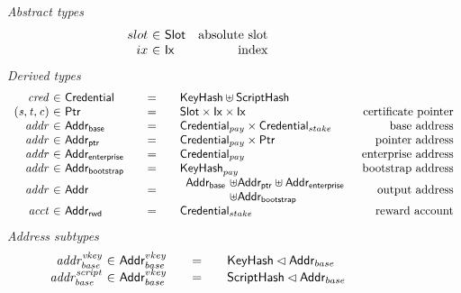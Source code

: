 \begin{figure*}[hbt]
  \emph{Abstract types}
  \begin{equation*}
    \begin{array}{r@{~\in~}lr}
      slot & \Slot & \text{absolute slot}\\
      ix & \Ix & \text{index}\\
    \end{array}
  \end{equation*}
  \emph{Derived types}
  \begin{equation*}
    \begin{array}{r@{~\in~}l@{\qquad=\qquad}lr}
      \var{cred} & \Credential & \KeyHash\uniondistinct\HashScr \\
      \var{(s,t,c)}
      & \Ptr
      & \Slot\times\Ix\times\Ix
      & \text{certificate pointer}
      \\
      \var{addr}
      & \AddrB
      & \Credential_{pay}\times\Credential_{stake}
      & \text{base address}
      \\
      \var{addr}
      & \AddrP
      & \Credential_{pay}\times\Ptr
      & \text{pointer address}
      \\
      \var{addr}
      & \AddrE
      & \Credential_{pay}
      & \text{enterprise address}
      \\
      \var{addr}
      & \AddrBS
      & \KeyHash_{pay}
      & \text{bootstrap address}
      \\
      \var{addr}
      & \Addr
      & \begin{array}{l@{~\uniondistinct}l}
          \AddrB & \AddrP \uniondistinct \AddrE
          \\
                 & \AddrBS
        \end{array}
      & \text{output address}
      \\
      \var{acct}
      & \AddrRWD
      & \Credential_{stake}
      & \text{reward account}
      \\
    \end{array}
  \end{equation*}
  \emph{Address subtypes}
  \begin{equation*}
    \begin{array}{r@{~\in~}l@{\qquad=\qquad}lr}
      \var{addr^{vkey}_{base}}
                 & \Addr^{vkey}_{base}
                               & \KeyHash\restrictdom\Addr_{base}
      \\
      \var{addr^{script}_{base}}
                 & \Addr^{vkey}_{base}
                               & \HashScr\restrictdom\Addr_{base}

\end{array}
\end{equation*}
\end{figure*}
